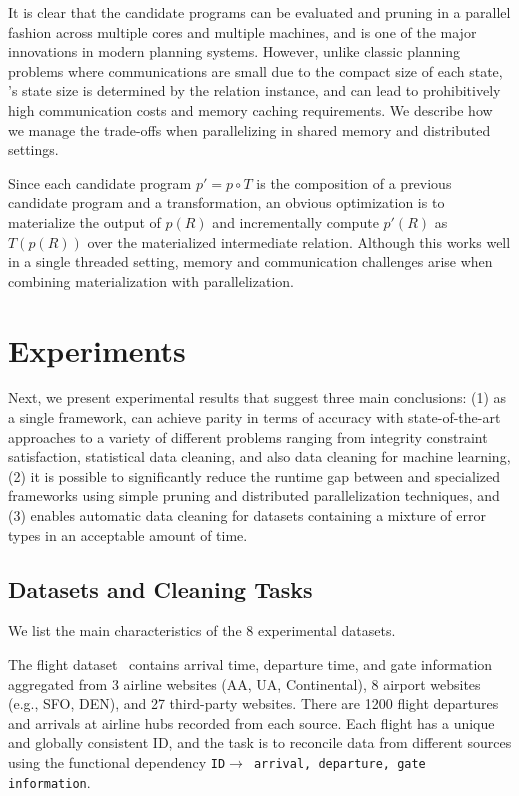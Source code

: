 It is clear that the candidate programs can be evaluated and pruning in a parallel fashion across multiple cores and multiple machines, and is one of the major innovations in modern planning systems.  However, unlike classic planning problems where communications are small due to the compact size of each state, \sys's state size is determined by the relation instance, and can lead to prohibitively high communication costs and memory caching requirements.   We describe how we manage the trade-offs when parallelizing \sys in shared memory and distributed settings.

 Since each candidate program $p' = p\circ T$ is the composition of a previous candidate program and a transformation, an obvious optimization is to materialize the output of $p(R)$ and incrementally compute $p'(R)$ as $T(p(R))$ over the materialized intermediate relation.  Although this works well in a single threaded setting, memory and communication challenges arise when combining materialization with parallelization.



\section{Experiments}\label{s:exp}
Next, we present experimental results that suggest three main conclusions: (1) as a single framework, \sys can achieve parity in terms of accuracy with state-of-the-art approaches to a variety of different problems ranging from integrity constraint satisfaction, statistical data cleaning, and also data cleaning for machine learning, (2) it is possible to significantly reduce the runtime gap between \sys and specialized frameworks using simple pruning and distributed parallelization techniques, and (3) \sys enables automatic data cleaning for datasets containing a mixture of error types in an acceptable amount of time.  

\subsection*{Datasets and Cleaning Tasks}
We list the main characteristics of the 8 experimental datasets.

 The flight dataset~\cite{data-flights} contains arrival time, departure time, and gate information aggregated from 3 airline websites (AA, UA, Continental), 8 airport websites (e.g., SFO, DEN), and 27 third-party websites.
There are 1200 flight departures and arrivals at airline hubs recorded from each source.  Each flight has a unique and globally consistent ID, and the task is to reconcile data from different sources using the functional dependency \texttt{ID$\rightarrow$ arrival, departure, gate information}.

